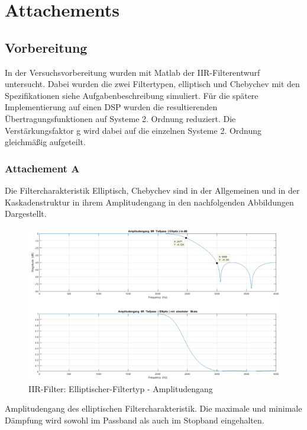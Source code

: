 \section{Attachements}
\subsection{Vorbereitung}
In der Versuchsvorbereitung wurden mit Matlab der IIR-Filterentwurf untersucht. Dabei wurden die zwei Filtertypen, elliptisch und Chebychev mit den Spezifikationen siehe Aufgabenbeschreibung simuliert. Für die spätere Implementierung auf einen DSP wurden die resultierenden Übertragungsfunktionen auf Systeme 2. Ordnung reduziert. Die Verstärkungsfaktor g wird dabei auf die einzelnen Systeme 2. Ordnung gleichmäßig aufgeteilt.
\subsubsection{Attachement A}

Die Filtercharakteristik Elliptisch, Chebychev sind in der Allgemeinen und in der Kaskadenstruktur in ihrem Amplitudengang in den nachfolgenden Abbildungen Dargestellt.

\begin{figure}[h]
\centering
\includegraphics[width=0.7\linewidth]{Bilder/Attachment_A_ELLIP}
\caption{IIR-Filter: Elliptischer-Filtertyp - Amplitudengang}
\label{fig:Attachment_A_ELLIP}
\end{figure}
\noindent Amplitudengang des elliptischen Filtercharakteristik. Die maximale und minimale Dämpfung wird sowohl im Passband als auch im Stopband eingehalten.

\newpage

